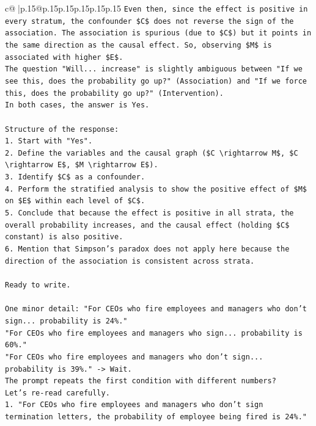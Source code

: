 \documentclass{article}
\begin{document}
{\begin{supertabular}{c@{$\;$}|p{.15\linewidth}@{}p{.15\linewidth}p{.15\linewidth}p{.15\linewidth}p{.15\linewidth}p{.15\linewidth}}
{{{\texttt{Even then, since the effect is positive in every stratum, the confounder \$C\$ does not reverse the sign of the association. The association is spurious (due to \$C\$) but it points in the same direction as the causal effect. So, observing \$M\$ is associated with higher \$E\$.} \\
\texttt{The question "Will... increase" is slightly ambiguous between "If we see this, does the probability go up?" (Association) and "If we force this, does the probability go up?" (Intervention).} \\
\texttt{In both cases, the answer is Yes.} \\
\\ 
\texttt{Structure of the response:} \\
\texttt{1. Start with "Yes".} \\
\texttt{2. Define the variables and the causal graph (\$C \textbackslash{}rightarrow M\$, \$C \textbackslash{}rightarrow E\$, \$M \textbackslash{}rightarrow E\$).} \\
\texttt{3. Identify \$C\$ as a confounder.} \\
\texttt{4. Perform the stratified analysis to show the positive effect of \$M\$ on \$E\$ within each level of \$C\$.} \\
\texttt{5. Conclude that because the effect is positive in all strata, the overall probability increases, and the causal effect (holding \$C\$ constant) is also positive.} \\
\texttt{6. Mention that Simpson's paradox does not apply here because the direction of the association is consistent across strata.} \\
\\ 
\texttt{Ready to write.} \\
\\ 
\texttt{One minor detail: "For CEOs who fire employees and managers who don't sign... probability is 24\%."} \\
\texttt{"For CEOs who fire employees and managers who sign... probability is 60\%."} \\
\texttt{"For CEOs who fire employees and managers who don't sign... probability is 39\%." {-}> Wait.} \\
\texttt{The prompt repeats the first condition with different numbers?} \\
\texttt{Let's re{-}read carefully.} \\
\texttt{1. "For CEOs who fire employees and managers who don't sign termination letters, the probability of employee being fired is 24\%."} \\
}}}
\end{supertabular}}
\end{document}

